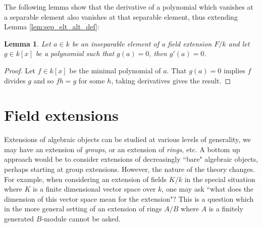 \documentclass[12pt]{article}
\theoremstyle{plain}
\newtheorem{lemma}[thm]{Lemma}
\theoremstyle{definition}
\begin{document}
	The following lemma show that the derivative of a polynomial which vanishes at a separable element also vanishes at that separable element, thus extending Lemma \ref{lem:sep_elt_alt_def}:
	\begin{lemma}
		\label{lem:seemingly_useless}
		Let $a \in k$ be an inseparable element of a field extension $F/k$ and let $g \in k[x]$ be a polynomial such that $g(a) = 0$, then $g'(a) = 0$.
	\end{lemma}
	\begin{proof}
		Let $f \in k[x]$ be the minimal polynomial of $a$. That $g(a) = 0$ implies $f$ divides $g$ and so $fh = g$ for some $h$, taking derivatives gives the result.
	\end{proof}
	\section{Field extensions}
	Extensions of algebraic objects can be studied at various levels of generality, we may have an extension of \emph{groups}, or an extension of \emph{rings}, etc. A bottom up approach would be to consider extensions of decreasingly ``bare" algebraic objects, perhaps starting at group extensions. However, the nature of the theory changes. For example, when considering an extension of fields $K/k$ in the special situation where $K$ is a finite dimensional vector space over $k$, one may ask ``what does the dimension of this vector space mean for the extension"? This is a question which in the more general setting of an extension of rings $A/B$ where $A$ is a finitely generated $B$-module cannot be asked.
	
\end{document}
